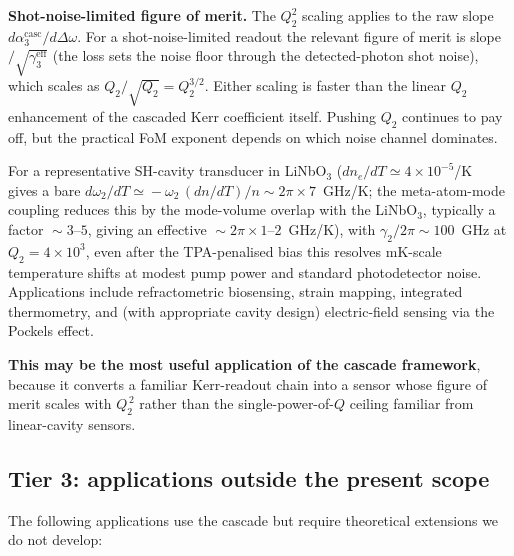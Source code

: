 \documentclass[11pt,a4paper]{article}
\newcommand{\Dom}{\Delta\omega}
\begin{document}
\textbf{Shot-noise-limited figure of merit.}  The $Q_2^{2}$ scaling
applies to the raw slope $d\alpha_3^\text{casc}/d\Dom$.  For a
shot-noise-limited readout the relevant figure of merit is
slope$/\sqrt{\gamma_3^\text{eff}}$ (the loss sets the noise floor
through the detected-photon shot noise), which scales as
$Q_2/\sqrt{Q_2}=Q_2^{3/2}$.  Either scaling is faster than the linear
$Q_2$ enhancement of the cascaded Kerr coefficient itself.  Pushing
$Q_2$ continues to pay off, but the practical FoM exponent depends on
which noise channel dominates.

For a representative SH-cavity transducer in LiNbO$_3$
($dn_e/dT\!\simeq\!4\!\times\!10^{-5}$/K~\cite{Nikogosyan2005} gives a
bare $d\omega_2/dT\!\simeq\!-\omega_2\,(dn/dT)/n\!\sim\!2\pi\times
7$~GHz/K; the meta-atom-mode coupling reduces this by the mode-volume
overlap with the LiNbO$_3$, typically a factor $\!\sim\!3$--$5$, giving
an effective $\!\sim\!2\pi\times 1$--$2$~GHz/K), with
$\gamma_2/2\pi\!\sim\!100$~GHz at $Q_2=4{\times}10^{3}$, even after the
TPA-penalised bias this resolves mK-scale temperature shifts at modest
pump power and standard photodetector noise.  Applications
include refractometric biosensing, strain mapping, integrated
thermometry, and (with appropriate cavity design) electric-field
sensing via the Pockels effect.

\textbf{This may be the most useful application of the cascade
framework}, because it converts a familiar Kerr-readout chain into a
sensor whose figure of merit scales with $Q_2^{\,2}$ rather than the
single-power-of-$Q$ ceiling familiar from linear-cavity sensors.

\subsection{Tier 3: applications outside the present scope}

The following applications use the cascade but require theoretical
extensions we do not develop:
\end{document}
